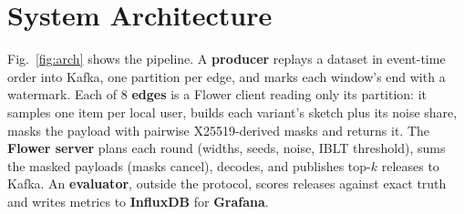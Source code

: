 \documentclass[conference]{IEEEtran}
\begin{document}
\section{System Architecture}
Fig.~\ref{fig:arch} shows the pipeline. A \textbf{producer} replays a dataset in event-time order into Kafka, one
partition per edge, and marks each window's end with a watermark. Each of 8 \textbf{edges} is a Flower client reading
only its partition: it samples one item per local user, builds each variant's sketch plus its noise share, masks the
payload with pairwise X25519-derived masks and returns it. The \textbf{Flower server} plans each round (widths, seeds,
noise, IBLT threshold), sums the masked payloads (masks cancel), decodes, and publishes top-$k$ releases to Kafka. An
\textbf{evaluator}, outside the protocol, scores releases against exact truth and writes metrics to \textbf{InfluxDB}
for \textbf{Grafana}.
\end{document}
